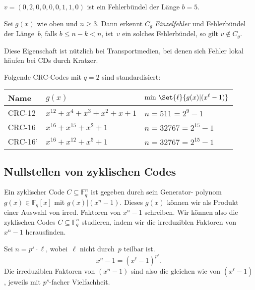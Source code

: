 \documentclass{cheat-sheet}
\newcommand{\F}{\mathbb{F}} %
\newcommand{\divides}{|} %
\begin{document}
\begin{bsp}
  $v = (0,2,0,0,0,0,1,1,0)$ ist ein Fehlerbündel der Länge $b = 5$.
\end{bsp}

\begin{prop}
  Sei $g(x)$ wie oben und $n \geq 3$.
  Dann erkennt $C_g$ \textit{Einzelfehler} und Fehlerbündel der Länge~$b$, falls $b \leq n - k < n$, \dh{} ist~$v$ ein solches Fehlerbündel, so gilt $v \not\in C_g$.
\end{prop}

\begin{bem}
  Diese Eigenschaft ist nützlich bei Transportmedien, bei denen sich Fehler lokal häufen \zB{} bei CDs durch Kratzer.
\end{bem}

\begin{bspe}
  Folgende CRC-Codes mit $q = 2$ sind standardisiert:

  \begin{tabular}{l | l | l}
    Name & $g(x)$ & $\min \, \Set{\ell}{g(x) \divides (x^\ell - 1)}$ \\ \hline
    CRC-12 & $x^{12} + x^4 + x^3 + x^2 + x + 1$ & $n = 511 = 2^9 - 1$ \\
    CRC-16 & $x^{16} + x^{15} + x^2 + 1$ & $n = 32767 = 2^{15} - 1$ \\
    CRC-16' & $x^{16} + x^{12} + x^5 + 1$ & $n = 32767 = 2^{15} - 1$
  \end{tabular}
\end{bspe}


\subsection{Nullstellen von zyklischen Codes}

\begin{ziel}
  Ein zyklischer Code $C \subseteq \F_q^n$ ist gegeben durch sein Generator- polynom $g(x) \in \F_q[x]$ mit $g(x) \divides (x^n - 1)$.
  Dieses $g(x)$ können wir als Produkt einer Auswahl von irred. Faktoren von $x^n - 1$ schreiben.
  Wir können also die zyklischen Codes $C \subseteq \F_q^n$ studieren, indem wir die irreduziblen Faktoren von $x^n - 1$ herausfinden.
\end{ziel}

\begin{bem}
  Sei $n = p^s \cdot \ell$, wobei~$\ell$ nicht durch~$p$ teilbar ist.
  \[
    x^n - 1 = (x^\ell - 1)^{p^s}.
  \]
  Die irreduziblen Faktoren von $(x^n - 1)$ sind also die gleichen wie von $(x^\ell - 1)$, jeweils mit $p^s$-facher Vielfachheit.
\end{bem}
\end{document}

